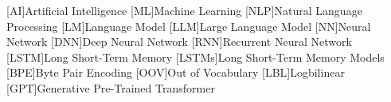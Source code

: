 
%







[AI]{Artificial Intelligence}
[ML]{Machine Learning}
[NLP]{Natural Language Processing}
[LM]{Language Model}
[LLM]{Large Language Model}
[NN]{Neural Network}
[DNN]{Deep Neural Network}
[RNN]{Recurrent Neural Network}
[LSTM]{Long Short-Term Memory}
[LSTMs]{Long Short-Term Memory Models}
[BPE]{Byte Pair Encoding}
[OOV]{Out of Vocabulary}
[LBL]{Logbilinear}
[GPT]{Generative Pre-Trained Transformer}




